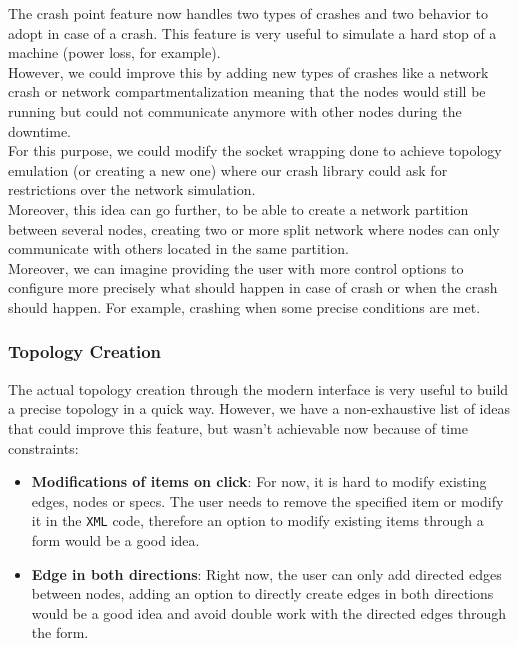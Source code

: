\documentclass{eplmastersthesis}
\begin{document}
          The crash point feature now handles two types of crashes and two
          behavior to adopt in case of a crash. This feature is very useful
          to simulate a hard stop of a machine (power loss, for example).\\

          However, we could improve this by adding new types of crashes like a
          network crash or network compartmentalization meaning that the
          nodes would still be running but could not communicate anymore
          with other nodes during the downtime.\\
          For this purpose, we could modify the socket wrapping done to achieve
          topology emulation (or creating a new one) where our crash library could ask
          for restrictions over the network simulation.\\
          Moreover, this idea can go further, to be able to create a network partition between
          several nodes, creating two or more split network where nodes can
          only communicate with others located in the same partition.\\

          Moreover, we can imagine providing the user with more control options
          to configure more precisely what should happen in case of crash or
          when the crash should happen. For example, crashing when some
          precise conditions are met.

        \subsubsection{Topology Creation}

          The actual topology creation through the modern interface is very
          useful to build a precise topology in a quick way. However, we have
          a non-exhaustive list of ideas that could improve this feature, but
          wasn't achievable now because of time constraints:

          \begin{itemize}
            \item \textbf{Modifications of items on click}: For now, it is hard
            to modify existing edges, nodes or specs. The user needs to remove
            the specified item or modify it in the \texttt{XML} code, therefore
            an option to modify existing items through a form would be a good
            idea.
            \item \textbf{Edge in both directions}: Right now, the user can only
            add directed edges between nodes, adding an option to directly
            create edges in both directions would be a good idea and
            avoid double work with the directed edges through the form.
          \end{itemize}
\end{document}
